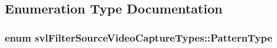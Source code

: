 \subsection{Enumeration Type Documentation}
\hypertarget{namespacesvl_filter_source_video_capture_types_a1c4eecd5680f271e0f58336666a69485}{
\subsubsection[{Pattern\-Type}]{\setlength{\rightskip}{0pt plus 5cm}enum {\bf svl\-Filter\-Source\-Video\-Capture\-Types\-::\-Pattern\-Type}}}\label{namespacesvl_filter_source_video_capture_types_a1c4eecd5680f271e0f58336666a69485}
